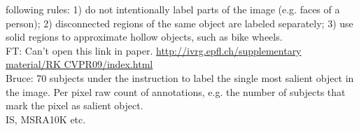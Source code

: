 \documentclass[10pt,letterpaper]{article}
\begin{document}
\begin{description}
 following rules: 1) do not intentionally label parts of the image (e.g. faces of a person); 2) disconnected regions of the same object are labeled separately; 3) use solid regions to approximate hollow objects, such as bike wheels.\\
FT\cite{achanta2009frequency}: 	Can't open this link in paper\cite{achanta2009frequency}. \url{http://ivrg.epfl.ch/supplementary material/RK CVPR09/index.html}\\
Bruce\cite{bruce2006saliency}: 70 subjects under the instruction to label the single most salient object in the image\cite{li2014secrets}. Per pixel raw count of annotations, e.g. the number of subjects that mark the pixel as salient object.\\
IS\cite{li2013visual}, MSRA10K\cite{ChengPAMI}\cite{13iccv/Cheng_Saliency}\cite{SalObjSurvey}\cite{SalObjBenchmark} etc.\\

{}
\end{description}
{\small


	
}
\end{document}
